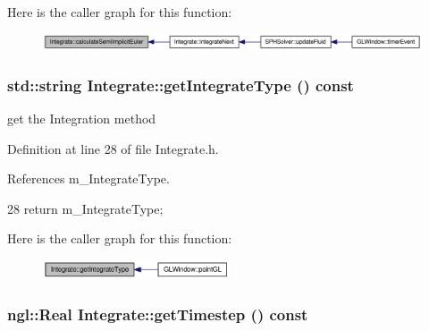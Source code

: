 Here is the caller graph for this function:\nopagebreak
\begin{figure}[H]
\begin{center}
\leavevmode
\includegraphics[width=339pt]{class_integrate_ae9b7697b3cf896e6db63fc9653846591_icgraph}
\end{center}
\end{figure}


\hypertarget{class_integrate_a3b44dc234ce6802e267ceaaff7379b32}{
\subsubsection[{getIntegrateType}]{\setlength{\rightskip}{0pt plus 5cm}std::string Integrate::getIntegrateType () const}}
\label{class_integrate_a3b44dc234ce6802e267ceaaff7379b32}


get the Integration method 



Definition at line 28 of file Integrate.h.



References m\_\-IntegrateType.




\begin{DoxyCode}
28 { return m_IntegrateType; }
\end{DoxyCode}




Here is the caller graph for this function:\nopagebreak
\begin{figure}[H]
\begin{center}
\leavevmode
\includegraphics[width=157pt]{class_integrate_a3b44dc234ce6802e267ceaaff7379b32_icgraph}
\end{center}
\end{figure}


\hypertarget{class_integrate_a1dc56e84dd8f2577f068be719d64a36b}{
\subsubsection[{getTimestep}]{\setlength{\rightskip}{0pt plus 5cm}ngl::Real Integrate::getTimestep () const}}
\label{class_integrate_a1dc56e84dd8f2577f068be719d64a36b}


